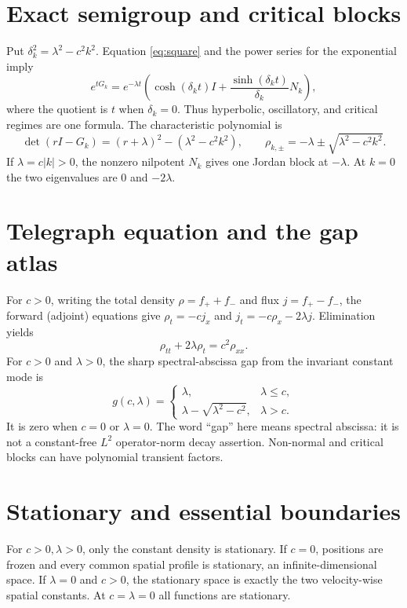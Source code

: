 \documentclass[10pt]{article}
\begin{document}
\section{Exact semigroup and critical blocks}
Put $\delta_k^2=\lambda^2-c^2k^2$.  Equation \eqref{eq:square} and the
power series for the exponential imply
\begin{equation}\label{eq:exp}
 e^{tG_k}=e^{-\lambda t}\left(\cosh(\delta_kt)I+
 \frac{\sinh(\delta_kt)}{\delta_k}N_k\right),
\end{equation}
where the quotient is $t$ when $\delta_k=0$.  Thus hyperbolic,
oscillatory, and critical regimes are one formula.  The characteristic
polynomial is
\[
 \det(rI-G_k)=(r+\lambda)^2-(\lambda^2-c^2k^2),
 \qquad \rho_{k,\pm}=-\lambda\pm\sqrt{\lambda^2-c^2k^2}.
\]
If $\lambda=c|k|>0$, the nonzero nilpotent $N_k$ gives one Jordan block at
$-\lambda$.  At $k=0$ the two eigenvalues are $0$ and $-2\lambda$.

\section{Telegraph equation and the gap atlas}
For $c>0$, writing the total density $\rho=f_++f_-$ and flux
$j=f_+-f_-$, the forward (adjoint) equations give
$\rho_t=-c j_x$ and $j_t=-c\rho_x-2\lambda j$.
Elimination yields
\begin{equation}\label{eq:telegraph}
 \rho_{tt}+2\lambda\rho_t=c^2\rho_{xx}.
\end{equation}
For $c>0$ and $\lambda>0$, the sharp spectral-abscissa gap from the invariant
constant mode is
\[
 g(c,\lambda)=\begin{cases}
 \lambda,&\lambda\leq c,\\
 \lambda-\sqrt{\lambda^2-c^2},&\lambda>c.
 \end{cases}
\]
It is zero when $c=0$ or $\lambda=0$.  The word ``gap'' here means spectral
abscissa: it is not a constant-free $L^2$ operator-norm decay assertion.
Non-normal and critical blocks can have polynomial transient factors.

\section{Stationary and essential boundaries}
For $c>0,\lambda>0$, only the constant density is stationary.  If $c=0$,
positions are frozen and every common spatial profile is stationary, an
infinite-dimensional space.  If $\lambda=0$ and $c>0$, the stationary space
is exactly the two velocity-wise spatial constants.  At $c=\lambda=0$ all
functions are stationary.
\end{document}
